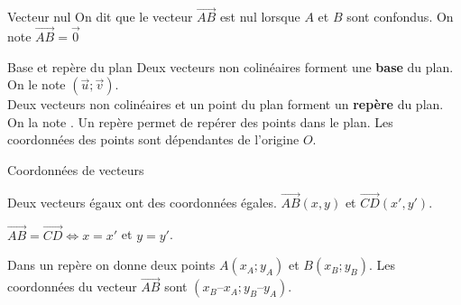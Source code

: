 \begin{DefT}{Vecteur nul}
On dit que le vecteur $\overrightarrow{AB}$ est nul lorsque $A$ et $B$ sont confondus. On note $\overrightarrow{AB}=\overrightarrow{0}$
\end{DefT}







\begin{DefT}{Base et repère du plan}
Deux vecteurs non colinéaires forment une \textbf{base} du plan. On le note $\left(\vec{u};\vec{v}\right)$.  \\ 
Deux vecteurs non colinéaires et un point du plan forment un \textbf{repère} du plan. On la note \Oij. Un repère permet de repérer des points dans le plan. Les coordonnées des points sont dépendantes de l'origine $O$.
\end{DefT}




\begin{ThT}{Coordonnées de vecteurs}

Deux vecteurs égaux ont des coordonnées égales.
$\overrightarrow{AB}(x,y)$ et $\overrightarrow{CD}(x',y')$.

$\overrightarrow{AB}=\overrightarrow{CD} \Longleftrightarrow x=x'$ et $y=y'$.

Dans un repère on donne deux points $A(x_A; y_A)$ et $B(x_B;y_B)$. Les coordonnées du vecteur $\overrightarrow{AB}$ sont $(x_B – x_A; y_B – y_A)$.
\end{ThT}


